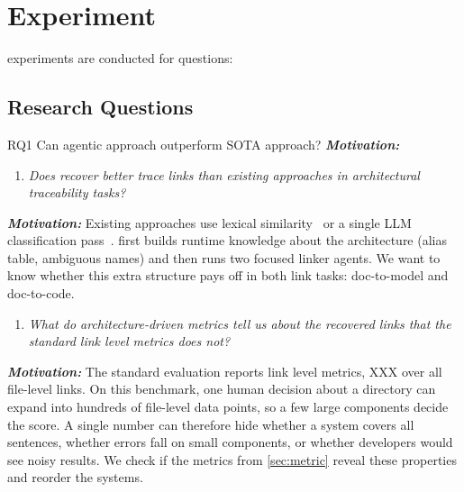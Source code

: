 \section{Experiment}

experiments are conducted for questions:
\subsection{Research Questions}

RQ1 Can agentic approach outperform SOTA approach?
\emph{\textbf{Motivation:}}

\begin{enumerate}[leftmargin=*, labelindent=0em, label=\textbf{RQ\arabic*}:,
ref=RQ\arabic*, series=researchQuestions] \item \label{RQ1 SOTA comparison}
\emph{Does \approach recover better trace links than existing approaches in architectural traceability tasks?} 
\end{enumerate}
\emph{\textbf{Motivation:}}
Existing approaches use lexical similarity~\cite{keim_trace_2021} or a single \ac{LLM}
classification pass~\cite{fuchs_whos_2025}. \approach first builds runtime knowledge about
the architecture (alias table, ambiguous names) and then runs two focused
linker agents. We want to know whether this extra structure pays off in both
link tasks: doc-to-model and doc-to-code.

\begin{enumerate}[leftmargin=*, labelindent=0em, label=\textbf{RQ\arabic*}:, ref=RQ\arabic*, series=researchQuestions, resume]
    \item \label{RQ2 metrics} \emph{What do architecture-driven metrics tell us about the recovered links that the standard link level metrics does not?}
\end{enumerate}
\emph{\textbf{Motivation:}}
The standard evaluation reports link level metrics, XXX over all file-level links.
On this benchmark, one human decision about a directory can expand into hundreds of file-level data points, 
so a few large components decide the score.
A single number can therefore hide whether a system covers all sentences, 
whether errors fall on small components, or whether developers would see noisy results.
We check if the metrics from \autoref{sec:metric} reveal these properties and reorder the systems.

